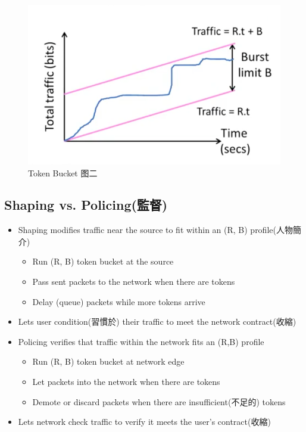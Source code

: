\documentclass[12pt]{ctexart}   %
\begin{document}
\begin{itemize}
		 \begin{figure}[h!] %
		\centering
		 \includegraphics[scale=0.7]{images/9-5-4}
		\caption{ Token Bucket 图二}
		 \label{fig:9-5-4}
		 \end{figure}
	\end{itemize}
	
	\subsection{Shaping vs. Policing(監督)}
	\begin{itemize}
		\item Shaping modifies traffic near the source to fit within an (R, B) profile(人物簡介)
		\begin{itemize}
			\item Run (R, B) token bucket at the source
			\item Pass sent packets to the network when there are tokens
			\item Delay (queue) packets while more tokens arrive
		\end{itemize}
		
		\item Lets user condition(習慣於) their traffic to meet the network contract(收縮)
		
		\item Policing verifies that traffic within the network fits an (R,B) profile
		\begin{itemize}
			\item Run (R, B) token  bucket at network edge
			\item Let packets into the network when there are tokens
			\item Demote or discard packets when there are insufficient(不足的) tokens
		\end{itemize}
		
		\item Lets network check traffic to verify it meets the user's contract(收縮)
	\end{itemize}
	
\end{document}
